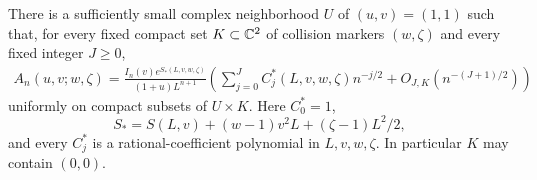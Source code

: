 \begin{theorem}\label{spm:thm:collision}
There is a sufficiently small complex neighborhood $U$ of $(u,v)=(1,1)$ such that, for every fixed compact set $K\subset\mathbb C^2$ of collision markers $(w,\zeta)$ and every fixed integer $J\geq0$,
\begin{align}\label{spm:eq:collision-theorem}
 A_n(u,v;w,\zeta)
 =\frac{I_n(v)e^{S_*(L,v,w,\zeta)}}{(1+u)L^{n+1}}
 \left(\sum_{j=0}^{J}C_j^*(L,v,w,\zeta)n^{-j/2}
       +O_{J,K}(n^{-(J+1)/2})\right)
\end{align}
uniformly on compact subsets of $U\times K$. Here $C_0^*=1$,
\begin{equation}\label{spm:eq:Sstar}
 S_*=S(L,v)+(w-1)v^2L+(\zeta-1)L^2/2,
\end{equation}
and every $C_j^*$ is a rational-coefficient polynomial in $L,v,w,\zeta$. In particular $K$ may contain $(0,0)$.
\end{theorem}
